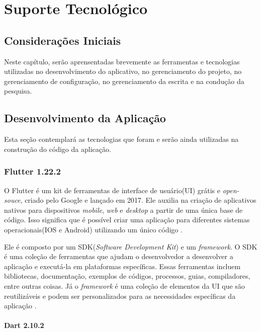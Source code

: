 \chapter[Suporte Tecnológico]{Suporte Tecnológico}
\label{ch:suporte}

\section{Considerações Iniciais}
Neste capítulo, serão aprensentadas brevemente as ferramentas e tecnologias 
utilizadas no desenvolvimento do aplicativo, no gerenciamento 
do projeto, no gerenciamento de configuração, no gerenciamento da 
escrita e na condução da pesquisa.

\section{Desenvolvimento da Aplicação}

Esta seção contemplará as tecnologias que foram e serão ainda utilizadas na construção do 
código da aplicação.

\subsection{Flutter 1.22.2}

O Flutter \cite{flutter2017} é um kit de ferramentas de interface de usuário(UI) 
grátis e \emph{open-souce}, criado pelo Google e lançado em 2017. 
Ele auxilia na criação de aplicativos nativos para dispositivos 
\emph{mobile}, \emph{web} e \emph{desktop} a partir de uma 
única base de código. Isso significa que é possível criar uma 
aplicação para diferentes sistemas operacionais(IOS e Android) 
utilizando um único código \cite{flutter2017}.

Ele é composto por um SDK(\emph{Software Development Kit}) e um
\emph{framework}. O SDK é uma coleção de ferramentas que ajudam
o desenvolvedor a desenvolver a aplicação e executá-la em
plataformas específicas. Essas ferramentas incluem bibliotecas,
documentação, exemplos de códigos, processos, guias,
compiladores, entre outras coisas. Já o \emph{framework} é
uma coleção de elementos da UI que são reutilizáveis e podem
ser personalizados para as necessidades específicas da
aplicação \cite{flutter2017}.

\subsubsection{Dart 2.10.2}

